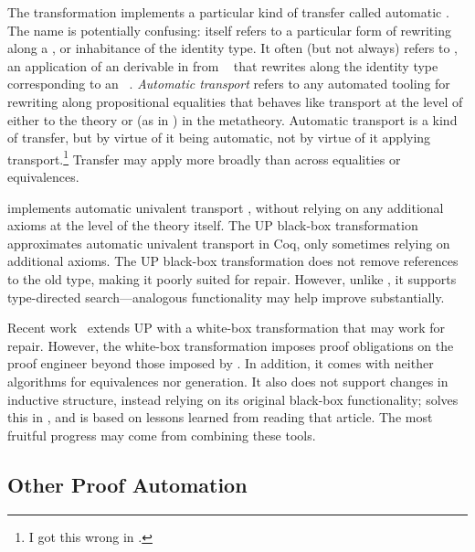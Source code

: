 The \toolnamec transformation implements a particular kind of transfer called automatic .
The name is potentially confusing:  itself refers to a particular form of 
rewriting along a , or inhabitance of the identity type.
It often (but not always) refers to  , an application of an  derivable
in  from ~\cite{univalent2013homotopy}
that rewrites along the identity type corresponding to an ~\cite{escardo2018self}.
\textit{Automatic transport} refers to any automated tooling for rewriting along propositional equalities
that behaves like transport at the level of either  to the theory or (as in \toolnamec)  in the metatheory.
Automatic transport is a kind of transfer, but by virtue of it being automatic, not by virtue of it applying transport.\footnote{I got this wrong in .}
Transfer may apply more broadly than across equalities or equivalences.

\toolnamec implements automatic univalent transport , without relying on any additional axioms at the level of the theory itself.
The UP black-box transformation~\cite{tabareau2017equivalences} approximates automatic univalent transport 
in Coq, only sometimes relying on additional axioms.
The UP black-box transformation does not remove references to the old type, making it poorly suited for repair.
However, unlike \toolnamec, it supports type-directed search---analogous functionality
may help improve \toolnamec substantially.

Recent work~\cite{tabareau2019marriage} extends UP with 
a white-box transformation that may work for repair.
However, the white-box transformation imposes proof obligations on the proof engineer beyond those imposed by \toolnamec.
In addition, it comes with neither  algorithms for equivalences nor  generation.
It also does not support changes in inductive structure,
instead relying on its original black-box functionality;
 solves this in \toolnamec, and is based on lessons learned from reading that article.
The most fruitful progress may come from combining these tools. %

\subsection{Other Proof Automation}
\label{sec:automation}

